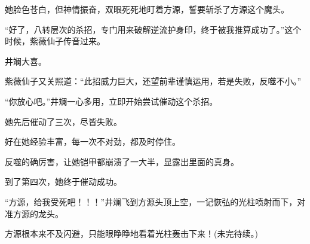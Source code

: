 \begin{this_body}
她脸色苍白，但神情振奋，双眼死死地盯着方源，誓要斩杀了方源这个魔头。

“好了，八转层次的杀招，专门用来破解逆流护身印，终于被我推算成功了。”这个时候，紫薇仙子传音过来。

井斓大喜。

紫薇仙子又关照道：“此招威力巨大，还望前辈谨慎运用，若是失败，反噬不小。”

“你放心吧。”井斓一心多用，立即开始尝试催动这个杀招。

她先后催动了三次，尽皆失败。

好在她经验丰富，每一次不对劲，都及时停住。

反噬的确厉害，让她铠甲都崩溃了一大半，显露出里面的真身。

到了第四次，她终于催动成功。

“方源，给我受死吧！！！”井斓飞到方源头顶上空，一记恢弘的光柱喷射而下，对准方源的龙头。

方源根本来不及闪避，只能眼睁睁地看着光柱轰击下来！(未完待续。)

\end{this_body}

